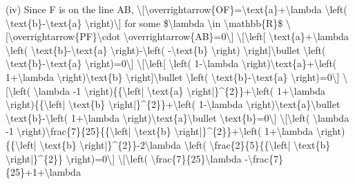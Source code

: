 (iv) Since F is on the line AB, \textbackslash{[}\textbackslash overrightarrow\{OF\}=\textbackslash text\{a\}+\textbackslash lambda
\textbackslash left( \textbackslash text\{b\}-\textbackslash text\{a\}
\textbackslash right)\textbackslash{]} for some \$\textbackslash lambda
\textbackslash in \textbackslash mathbb\{R\}\$ \textbackslash{[}\textbackslash overrightarrow\{PF\}\textbackslash cdot
\textbackslash overrightarrow\{AB\}=0\textbackslash{]} \textbackslash{[}\textbackslash left{[}
\textbackslash text\{a\}+\textbackslash lambda \textbackslash left(
\textbackslash text\{b\}-\textbackslash text\{a\} \textbackslash right)-\textbackslash left(
-\textbackslash text\{b\} \textbackslash right) \textbackslash right{]}\textbackslash bullet
\textbackslash left( \textbackslash text\{b\}-\textbackslash text\{a\}
\textbackslash right)=0\textbackslash{]} \textbackslash{[}\textbackslash left{[}
\textbackslash left( 1-\textbackslash lambda \textbackslash right)\textbackslash text\{a\}+\textbackslash left(
1+\textbackslash lambda \textbackslash right)\textbackslash text\{b\}
\textbackslash right{]}\textbackslash bullet \textbackslash left(
\textbackslash text\{b\}-\textbackslash text\{a\} \textbackslash right)=0\textbackslash{]}
\textbackslash{[}\textbackslash left( \textbackslash lambda -1
\textbackslash right)\{\{\textbackslash left| \textbackslash text\{a\}
\textbackslash right|\}\textasciicircum\{2\}\}+\textbackslash left(
1+\textbackslash lambda \textbackslash right)\{\{\textbackslash left|
\textbackslash text\{b\} \textbackslash right|\}\textasciicircum\{2\}\}+\textbackslash left(
1-\textbackslash lambda \textbackslash right)\textbackslash text\{a\}\textbackslash bullet
\textbackslash text\{b\}-\textbackslash left( 1+\textbackslash lambda
\textbackslash right)\textbackslash text\{a\}\textbackslash bullet
\textbackslash text\{b\}=0\textbackslash{]} \textbackslash{[}\textbackslash left(
\textbackslash lambda -1 \textbackslash right)\textbackslash frac\{7\}\{25\}\{\{\textbackslash left|
\textbackslash text\{b\} \textbackslash right|\}\textasciicircum\{2\}\}+\textbackslash left(
1+\textbackslash lambda \textbackslash right)\{\{\textbackslash left|
\textbackslash text\{b\} \textbackslash right|\}\textasciicircum\{2\}\}-2\textbackslash lambda
\textbackslash left( \textbackslash frac\{2\}\{5\}\{\{\textbackslash left|
\textbackslash text\{b\} \textbackslash right|\}\textasciicircum\{2\}\}
\textbackslash right)=0\textbackslash{]} \textbackslash{[}\textbackslash left(
\textbackslash frac\{7\}\{25\}\textbackslash lambda -\textbackslash frac\{7\}\{25\}+1+\textbackslash lambda
